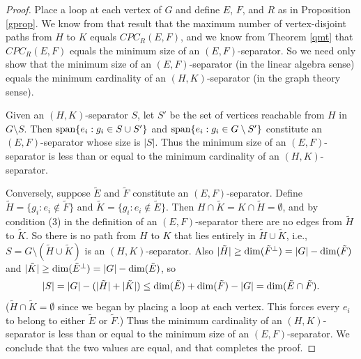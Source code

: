 \documentclass{amsart}
\theoremstyle{definition}
\begin{document}
\begin{proof}
Place a loop at each vertex of $G$ and define $E$, $F$, and $R$ as in Proposition \ref{gprop}. We know from that result that the maximum number of vertex-disjoint paths from $H$ to $K$ equals $CPC_R(E,F)$, and we know from Theorem \ref{qmt} that $CPC_R(E,F)$ equals the minimum size of an $(E,F)$-separator. So we need only show that the minimum size of an $(E,F)$-separator (in the linear algebra sense) equals the minimum cardinality of an $(H,K)$-separator (in the graph theory sense).

Given an $(H,K)$-separator $S$, let $S'$ be the set of vertices reachable from $H$ in $G\setminus S$. Then ${\rm span}\{e_i: g_i \in S \cup S'\}$ and ${\rm span}\{e_i: g_i \in G\setminus S'\}$ constitute an $(E,F)$-separator whose size is $|S|$. Thus the minimum size of an $(E,F)$-separator is less than or equal to the minimum cardinality of an $(H,K)$-separator.

Conversely, suppose $\tilde{E}$ and $\tilde{F}$ constitute an $(E,F)$-separator. Define $\tilde{H} = \{g_i: e_i \not\in \tilde{F}\}$ and $\tilde{K} = \{g_i: e_i \not\in \tilde{E}\}$. Then $H \cap \tilde{K} = K \cap \tilde{H} = \emptyset$, and by condition (3) in the definition of an $(E,F)$-separator there are no edges from $\tilde{H}$ to $\tilde{K}$. So there is no path from $H$ to $K$ that lies entirely in $\tilde{H} \cup \tilde{K}$, i.e., $S = G\setminus (\tilde{H} \cup \tilde{K})$ is an $(H,K)$-separator. Also $|\tilde{H}| \geq {\rm dim}(\tilde{F}^\perp) = |G| - {\rm dim}(\tilde{F})$ and $|\tilde{K}| \geq {\rm dim}(\tilde{E}^\perp) = |G| - {\rm dim}(\tilde{E})$, so $$|S| = |G| - (|\tilde{H}| + |\tilde{K}|)  \leq {\rm dim}(\tilde{E}) + {\rm dim}(\tilde{F}) - |G| = {\rm dim}(\tilde{E} \cap \tilde{F}).$$ ($\tilde{H} \cap \tilde{K} = \emptyset$ since we began by placing a loop at each vertex. This forces every $e_i$ to belong to either $\tilde{E}$ or $\tilde{F}$.) Thus the minimum cardinality of an $(H,K)$-separator is less than or equal to the minimum size of an $(E,F)$-separator. We conclude that the two values are equal, and that completes the proof.
\end{proof}
\end{document}
